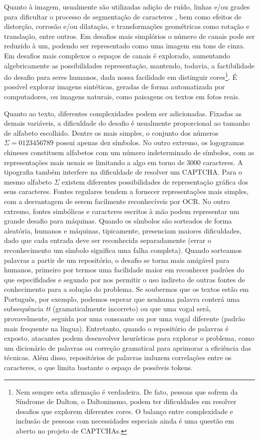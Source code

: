 Quanto à imagem, usualmente são utilizadas adição de ruído, linhas e/ou grades para dificultar o processo de segmentação de caracteres \cite{lectures2005HIP}, bem como efeitos de distorção, corrosão e/ou dilatação, e transformações geométricas como rotação e translação, entre outros. Em desafios mais simplórios o número de canais pode ser reduzido à um, podendo ser representado como uma imagem em tons de cinza. Em desafios mais complexos o espaços de canais é explorado, aumentando algebricamente as possibilidades representação, mantendo, todavia, a factibilidade do desafio para seres humanos, dada nossa facilidade em distinguir cores\footnote{Nem sempre esta afirmação é verdadeira. De fato, pessoas que sofrem da Síndrome de Dalton, o Daltoninsmo, podem ter dificuldades em resolver desafios que explorem diferentes cores. O balanço entre complexidade e inclusão de pessoas com necessidades especiais ainda é uma questão em aberto no projeto de CAPTCHAs.}. É possível explorar imagens sintéticas, geradas de forma automatizada por computadores, ou imagens naturais, como paisagens ou textos em fotos reais. 

Quanto ao texto, diferentes complexidades podem ser adicionadas. Fixadas as demais variáveis, a dificuldade do desafio é usualmente proporcional ao tamanho de alfabeto escolhido. Dentre os mais simples, o conjunto dos números $\Sigma = {0123456789}$ possui apenas dez símbolos. No outro extremo, os logogramas chineses constituem alfabetos com um número indeterminado de símbolos, com as representações mais usuais se limitando a algo em torno de $3000$ caracteres. A tipografia também interfere na dificuldade de resolver um CAPTCHA. Para o mesmo alfabeto $\Sigma$ existem diferentes possibilidades de representação gráfica dos seus caracteres. Fontes regulares tendem a fornecer representações mais simples, com a desvantagem de serem facilmente reconhecíveis por OCR. No outro extremo, fontes simbólicas e caracteres escritos à mão podem representar um grande desafio para máquinas. Quando os símbolos são sorteados de forma aleatória, humanos e máquinas, tipicamente, presenciam maiores dificuldades, dado que cada entrada deve ser reconhecida separadamente (errar o reconhecimento um símbolo significa uma falha completa). Quando sorteamos palavras a partir de um repositório, o desafio se torna mais amigável para humanos, primeiro por termos uma facilidade maior em reconhecer padrões do que especifidades e segundo por nos permitir o uso indireto de outras fontes de conhecimento para a solução do problema. Se soubermos que os textos estão em Português, por exemplo, podemos esperar que nenhuma palavra conterá uma subsequência \textit{tt} (gramaticalmente incorreto) ou que uma vogal será, provavelmente, seguida por uma consoante ou por uma vogal diferente (padrão mais frequente na língua). Entretanto, quando o repositório de palavras é exposto, atacantes podem desenvolver heurísticas para explorar o problema, como um dicionário de palavras ou correção gramatical para aprimorar a eficiência das técnicas. Além disso, repositórios de palavras induzem correlações entre os caracteres, o que limita bastante o espaço de possíveis tokens. 

